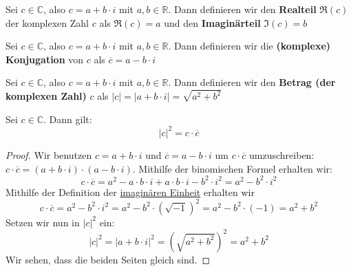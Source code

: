 \documentclass[../../main.tex]{subfiles}
\begin{document}
			\begin{definition}
				\label{def:Realteil}
				\label{def:Imaginärteil}
				Sei $c \in \mathbb{C}$, also $c = a+b \cdot i$ mit $a,b \in \mathbb{R}$. Dann definieren wir den \textbf{Realteil} $\mathfrak{R}(c)$ der komplexen Zahl $c$ als $\mathfrak{R}(c) = a$ und den \textbf{Imaginärteil} $\mathfrak{I}(c)=b$
			\end{definition}
		
			\begin{definition}
				\label{def:komplexKonjugiert}
				\label{def:komplexeKonjugation}
				Sei $c \in \mathbb{C}$, also $c = a+b \cdot i$ mit $a,b \in \mathbb{R}$. Dann definieren wir die \textbf{(komplexe) Konjugation} von $c$ als $\overline{c} = a - b \cdot i$
			\end{definition}
		
			\begin{definition}
				\label{def:betragKomplexerZahl}
				Sei $c \in \mathbb{C}$, also $c = a+b \cdot i$ mit $a,b \in \mathbb{R}$. Dann definieren wir den \textbf{Betrag (der komplexen Zahl)} $c$ als $|c| = |a + b \cdot i| = \sqrt{a^2 + b^2}$
			\end{definition}
		
			\begin{theorem}
				Sei $c \in \mathbb{C}$. Dann gilt: $$|c|^2 = c \cdot \overline{c}$$
				\begin{proof}
					Wir benutzen $c=a+b\cdot i$ und $\overline{c}=a-b\cdot i$ um $c \cdot \overline{c}$ umzuschreiben: $c \cdot \overline{c} = (a+b \cdot i) \cdot (a-b\cdot i)$. Mithilfe der binomischen Formel erhalten wir: $$c \cdot \overline{c} = a^2 - a \cdot b \cdot i + a \cdot b \cdot i - b^2 \cdot i^2 = a^2 - b^2 \cdot i^2$$ Mithilfe der Definition der \hyperref[def:imaginäreEinheit]{imaginären Einheit} erhalten wir $$c \cdot \overline{c} = a^2 - b^2 \cdot i^2 = a^2 - b^2 \cdot (\sqrt{-1})^2 = a^2 - b^2 \cdot (-1) = a^2 + b^2$$ Setzen wir nun in $|c|^2$ ein: $$|c|^2 = |a+b\cdot i|^2 = (\sqrt{a^2+b^2})^2 = a^2 + b^2$$ Wir sehen, dass die beiden Seiten gleich sind. 
				\end{proof}
			\end{theorem}
	
\end{document}
